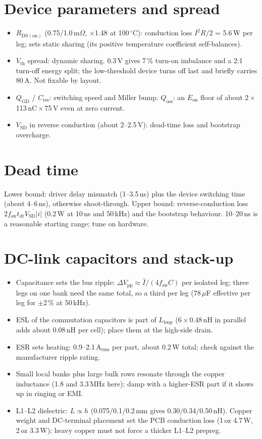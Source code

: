﻿\documentclass[10pt,a4paper]{article}
\newcommand{\uF}{\ensuremath{\mu}F}
\begin{document}
\section{Device parameters and spread}
\begin{itemize}\itemsep0pt
\item $R_\mathrm{DS(on)}$ (0.75/1.0\,m$\Omega$, $\times$1.48 at 100\,$^\circ$C): conduction loss $I^2R/2$ = 5.6\,W per leg; sets static sharing (its positive temperature coefficient self-balances).
\item $V_\mathrm{th}$ spread: dynamic sharing. 0.3\,V gives 7\,\% turn-on imbalance and a 2:1 turn-off energy split; the low-threshold device turns off last and briefly carries 80\,A. Not fixable by layout.
\item $Q_\mathrm{GD}$ / $C_\mathrm{rss}$: switching speed and Miller bump. $Q_\mathrm{oss}$: an $E_\mathrm{on}$ floor of about 2\,$\times$\,113\,nC\,$\times$\,75\,V even at zero current.
\item $V_\mathrm{SD}$ in reverse conduction (about 2--2.5\,V): dead-time loss and bootstrap overcharge.
\end{itemize}

\section{Dead time}
Lower bound: driver delay mismatch (1--3.5\,ns) plus the device switching time (about 4--6\,ns), otherwise shoot-through. Upper bound: reverse-conduction loss $2f_\mathrm{sw}t_\mathrm{dt}\overline{V_\mathrm{SD}|i|}$ (0.2\,W at 10\,ns and 50\,kHz) and the bootstrap behaviour. 10--20\,ns is a reasonable starting range; tune on hardware.

\section{DC-link capacitors and stack-up}
\begin{itemize}\itemsep0pt
\item Capacitance sets the bus ripple: $\Delta V_\mathrm{pp}\approx\hat I/(4f_\mathrm{sw}C)$ per isolated leg; three legs on one bank need the same total, so a third per leg (78\,\uF{} effective per leg for $\pm$2\,\% at 50\,kHz).
\item ESL of the commutation capacitors is part of $L_\mathrm{loop}$ (6\,$\times$\,0.48\,nH in parallel adds about 0.08\,nH per cell); place them at the high-side drain.
\item ESR sets heating: 0.9--2.1\,A$_\mathrm{rms}$ per part, about 0.2\,W total; check against the manufacturer ripple rating.
\item Small local banks plus large bulk rows resonate through the copper inductance (1.8 and 3.3\,MHz here); damp with a higher-ESR part if it shows up in ringing or EMI.
\item L1--L2 dielectric: $L\propto h$ (0.075/0.1/0.2\,mm gives 0.30/0.34/0.50\,nH). Copper weight and DC-terminal placement set the PCB conduction loss (1\,oz 4.7\,W, 2\,oz 3.3\,W); heavy copper must not force a thicker L1--L2 prepreg.
\end{itemize}
\end{document}
